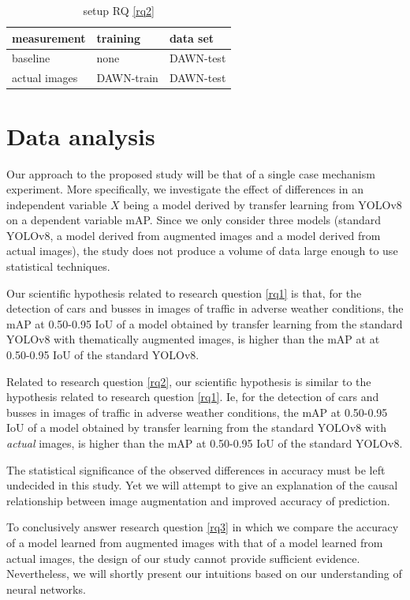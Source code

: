 \documentclass[]{article}
\begin{document}
	\begin{table}[H]
		\centering
		\begin{tabular}{lll}
			\toprule
			\textbf{measurement} & \textbf{training} & \textbf{data set} \\
			\midrule
			baseline & none & DAWN-test \\
			actual images & DAWN-train & DAWN-test \\
			\bottomrule
		\end{tabular}
		\caption{setup RQ \ref{rq2}}
		\label{table:setuprq2}
	\end{table}

\section{Data analysis}

	Our approach to the proposed study will be that of a single case mechanism experiment. More specifically, we investigate the effect of differences in an independent variable $X$ being a model derived by transfer learning from YOLO{\small v8} on a dependent variable mAP. Since we only consider three models (standard YOLO{\small v8}, a model derived from augmented images and a model derived from actual images), the study does not produce a volume of data large enough to use statistical techniques.
	
	Our scientific hypothesis related to research question \ref{rq1} is that, for the detection of cars and busses in images of traffic in adverse weather conditions, the mAP at 0.50-0.95 IoU of a model obtained by transfer learning from the standard YOLO{\small v8} with thematically augmented images, is higher than the mAP at at 0.50-0.95 IoU of the standard YOLO{\small v8}. 	
	
	Related to research question \ref{rq2}, our scientific hypothesis is similar to the hypothesis related to research question \ref{rq1}. Ie, for the detection of cars and busses in images of traffic in adverse weather conditions, the mAP at 0.50-0.95 IoU of a model obtained by transfer learning from the standard YOLO{\small v8} with  \textit{actual} images, is higher than the mAP at 0.50-0.95 IoU of the standard YOLO{\small v8}.  
	
	The statistical significance of the observed differences in accuracy must be left undecided in this study. Yet we will attempt to give an explanation of the causal relationship between image augmentation and improved accuracy of prediction.
	
	To conclusively answer research question \ref{rq3} in which we compare the accuracy of a model learned from augmented images with that of a model learned from actual images, the design of our study cannot provide sufficient evidence. Nevertheless, we will shortly present our intuitions based on our understanding of neural networks.
	
\end{document}
